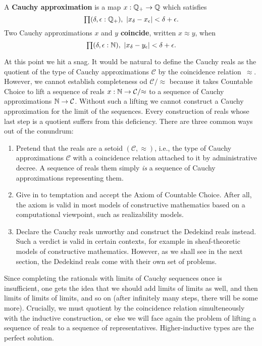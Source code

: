 \begin{defn}\label{defn:cauchy-approximation}
  A \textbf{Cauchy approximation} is a map $x : \mathbb{Q}_{+} \to \mathbb{Q}$ which satisfies
  \begin{equation}
    \label{eq:cauchy-approx}
    \prd{\delta, \epsilon :\Qp} |x_\delta - x_\epsilon| < \delta + \epsilon.
  \end{equation}
  Two Cauchy approximations $x$ and $y$ \textbf{coincide}, written $x \approx y$, when
  \begin{equation}
    \label{eq:cauchy-coincide}
    \prd{\delta, \epsilon:\N} |x_\delta - y_\epsilon| < \delta + \epsilon.
  \end{equation}
\end{defn}

At this point we hit a snag. It would be natural to define the Cauchy reals as the
quotient of the type of Cauchy approximations $\mathcal{C}$ by the coincidence
relation~$\approx$. However, we cannot establish completeness od $\mathcal{C}/{\approx}$
because it takes Countable Choice to lift a sequence of reals $x : \mathbb{N} \to
\mathcal{C}/{\approx}$ to a sequence of Cauchy approximations $\mathbb{N} \to \mathcal{C}$.
Without such a lifting we cannot construct a Cauchy approximation for the limit of the
sequences. Every construction of reals whose last step is a quotient suffers from this
deficiency. There are three common ways out of the conundrum:
%
\begin{enumerate}
\item Pretend that the reals are a setoid $(\mathcal{C}, {\approx})$, i.e., the type of
  Cauchy approximations $\mathcal{C}$ with a coincidence relation attached to it by
  administrative decree. A sequence of reals them simply \emph{is} a sequence of Cauchy
  approximations representing them.
\item Give in to temptation and accept the Axiom of Countable Choice. After all, the axiom
  is valid in most models of constructive mathematics based on a computational viewpoint,
  such as realizability models.
\item Declare the Cauchy reals unworthy and construct the Dedekind reals instead. Such a
  verdict is valid in certain contexts, for example in sheaf-theoretic models of
  constructive mathematics. However, as we shall see in the next section, the Dedekind
  reals come with their own set of problems.
\end{enumerate}
%
Since completing the rationals with limits of Cauchy sequences once is insufficient, one
gets the idea that we should add limits of limits as well, and then limits of limits of
limits, and so on (after infinitely many steps, there will be some more). Crucially, we
must quotient by the coincidence relation simulteneously with the inductive construction,
or else we will face again the problem of lifting a sequence of reals to a sequence of
representatives. Higher-inductive types are the perfect solution.

